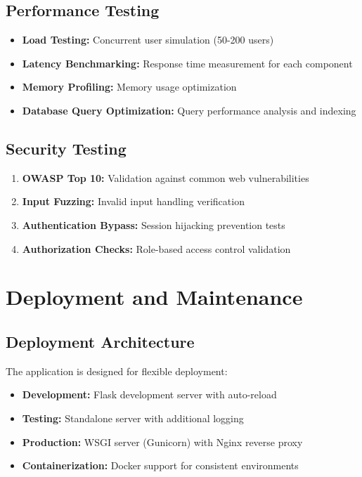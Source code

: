 \documentclass[12pt,a4paper,twoside]{report}
\begin{document}
\subsection{Performance Testing}

\begin{itemize}
    \item \textbf{Load Testing:} Concurrent user simulation (50-200 users)
    \item \textbf{Latency Benchmarking:} Response time measurement for each component
    \item \textbf{Memory Profiling:} Memory usage optimization
    \item \textbf{Database Query Optimization:} Query performance analysis and indexing
\end{itemize}

\subsection{Security Testing}

\begin{enumerate}
    \item \textbf{OWASP Top 10:} Validation against common web vulnerabilities
    \item \textbf{Input Fuzzing:} Invalid input handling verification
    \item \textbf{Authentication Bypass:} Session hijacking prevention tests
    \item \textbf{Authorization Checks:} Role-based access control validation
\end{enumerate}

\section{Deployment and Maintenance}

\subsection{Deployment Architecture}

The application is designed for flexible deployment:

\begin{itemize}
    \item \textbf{Development:} Flask development server with auto-reload
    \item \textbf{Testing:} Standalone server with additional logging
    \item \textbf{Production:} WSGI server (Gunicorn) with Nginx reverse proxy
    \item \textbf{Containerization:} Docker support for consistent environments
\end{itemize}
\end{document}

